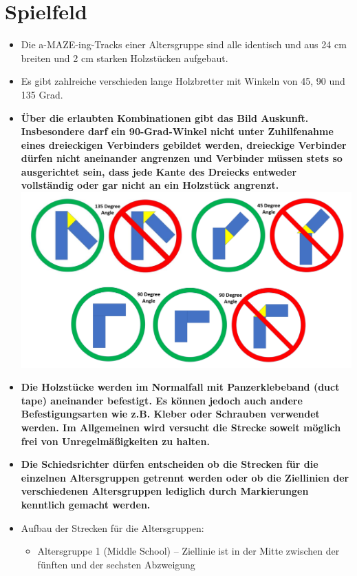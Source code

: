 \documentclass[a4paper,12pt]{article}
\begin{document}
\section{Spielfeld}
\begin{itemize}
\item Die a-MAZE-ing-Tracks einer Altersgruppe sind alle identisch und aus 24 cm breiten und 2 cm starken
Holzstücken aufgebaut.
\item Es gibt zahlreiche verschieden lange Holzbretter mit Winkeln von 45, 90 und 135
Grad.
\item \textbf{Über die erlaubten Kombinationen gibt das Bild Auskunft. Insbesondere darf ein
90-Grad-Winkel nicht unter Zuhilfenahme eines dreieckigen Verbinders gebildet werden, dreieckige 
Verbinder dürfen nicht aneinander angrenzen und Verbinder müssen stets so ausgerichtet sein, dass
jede Kante des Dreiecks entweder vollständig oder gar nicht an ein Holzstück angrenzt. \\}
\includegraphics[width=1.0\textwidth]{amazeing_allowed.png}
\item \textbf{Die Holzstücke werden im Normalfall mit Panzerklebeband (duct tape) aneinander befestigt.
Es können jedoch auch andere Befestigungsarten wie z.B. Kleber oder Schrauben verwendet werden.
Im Allgemeinen wird versucht die Strecke soweit möglich frei von Unregelmäßigkeiten zu halten.}
\item \textbf{Die Schiedsrichter dürfen entscheiden ob die Strecken für die einzelnen Altersgruppen
getrennt werden oder ob die Ziellinien der verschiedenen Altersgruppen lediglich durch Markierungen
kenntlich gemacht werden.}
\item Aufbau der Strecken für die Altersgruppen:
\begin{itemize}
\item Altersgruppe 1 (Middle School) – Ziellinie ist in der Mitte zwischen der fünften und der sechsten Abzweigung

\end{itemize}
\end{itemize}
\end{document}
